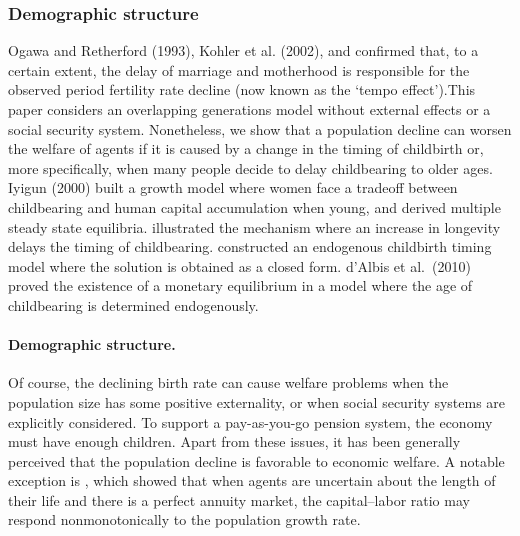 \documentclass[nogrid]{MBE}%
\begin{document}
{\subsubsection{Demographic structure}
Ogawa and Retherford (1993), Kohler et al. (2002), and \citep{Miller:1974} confirmed that, to a
certain extent, the delay of marriage and motherhood is responsible for the observed period
fertility rate decline (now known as the `tempo effect').This paper considers an overlapping
generations model without external effects or a social security system. Nonetheless, we show that
a population decline can worsen the welfare of agents if it is caused by a change in the timing of
childbirth or, more specifically, when many people decide to delay childbearing to older ages.
Iyigun (2000) built a growth model where women face a tradeoff between childbearing and human
capital accumulation when young, and derived multiple steady state equilibria.
\citet{Vandenkoornhuyse_Baldauf_Leyval_Straczek_Young:2002} illustrated the mechanism where an
increase in longevity delays the timing of childbearing. \citet{Guindon_Gascuel:2003} constructed
an endogenous childbirth timing model where the solution is obtained as a closed form. d'Albis et
al.\ (2010) proved the existence of a monetary equilibrium in a model where the age of
childbearing is determined endogenously.
%
%
%



\paragraph{Demographic structure.} Of course, the declining birth rate can cause welfare problems when the
population size has some positive externality, or when social security systems are explicitly
considered. {To support a pay-as-you-go pension system, the economy must have enough children.}
Apart from these issues, it has been generally perceived that the population decline is favorable
to economic welfare. {A notable exception is \citep{Felsenstein:2004}, which showed that when
agents are uncertain about the length of their life and there is a perfect annuity market, the
capital--labor ratio may respond nonmonotonically to the population growth rate.}



}
\end{document}
